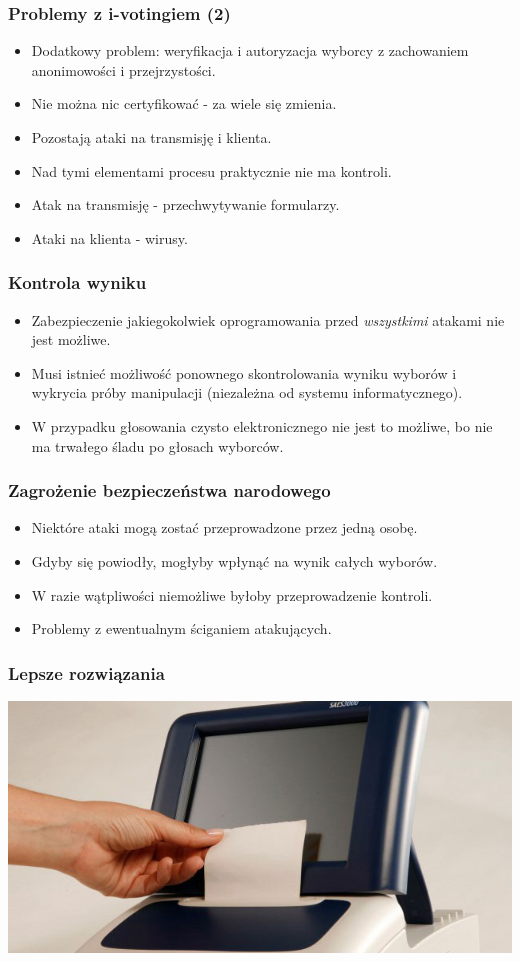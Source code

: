 \documentclass{beamer}
\begin{document}
\begin{frame}
\frametitle{Problemy z i-votingiem (2)}
\begin{itemize}
\item Dodatkowy problem: weryfikacja i autoryzacja wyborcy z zachowaniem anonimowości i przejrzystości.\pause
\item Nie można nic certyfikować - za wiele się zmienia. \pause
\item Pozostają ataki na transmisję i klienta.\pause
\item Nad tymi elementami procesu praktycznie nie ma kontroli. \pause
\item Atak na transmisję - przechwytywanie formularzy.\pause
\item Ataki na klienta - wirusy.
\end{itemize}
\end{frame}

\begin{frame}
\frametitle{Kontrola wyniku}\pause
\begin{itemize}
\item Zabezpieczenie jakiegokolwiek oprogramowania przed \textit{wszystkimi} atakami nie jest możliwe.\pause
\item Musi istnieć możliwość ponownego skontrolowania wyniku wyborów i wykrycia próby manipulacji (niezależna od systemu informatycznego).\pause
\item W przypadku głosowania czysto elektronicznego nie jest to możliwe, bo nie ma trwałego śladu po głosach wyborców.
\end{itemize}
\end{frame}

\begin{frame}
\frametitle{Zagrożenie bezpieczeństwa narodowego}
\begin{itemize}
\item Niektóre ataki mogą zostać przeprowadzone przez jedną osobę.\pause
\item Gdyby się powiodły, mogłyby wpłynąć na wynik całych wyborów. \pause
\item W razie wątpliwości niemożliwe byłoby przeprowadzenie kontroli.\pause
\item Problemy z ewentualnym ściganiem atakujących.
\end{itemize}
\end{frame}

\begin{frame}
\frametitle{Lepsze rozwiązania}
\includegraphics[height=0.8\paperheight, center]{vvpat}
\end{frame}
\end{document}
